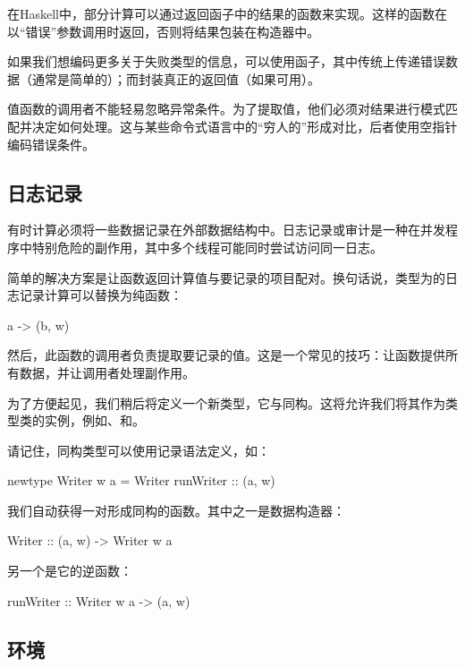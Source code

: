 \documentclass[DaoFP]{subfiles}
\begin{document}
在Haskell中，部分计算可以通过返回函子中的结果的函数来实现。这样的函数在以“错误”参数调用时返回，否则将结果包装在构造器中。

如果我们想编码更多关于失败类型的信息，可以使用函子，其中传统上传递错误数据（通常是简单的）；而封装真正的返回值（如果可用）。

值函数的调用者不能轻易忽略异常条件。为了提取值，他们必须对结果进行模式匹配并决定如何处理。这与某些命令式语言中的“穷人的”形成对比，后者使用空指针编码错误条件。

\subsection{日志记录}

有时计算必须将一些数据记录在外部数据结构中。日志记录或审计是一种在并发程序中特别危险的副作用，其中多个线程可能同时尝试访问同一日志。

简单的解决方案是让函数返回计算值与要记录的项目配对。换句话说，类型为的日志记录计算可以替换为纯函数：
\begin{haskell}
a -> (b, w)
\end{haskell}
然后，此函数的调用者负责提取要记录的值。这是一个常见的技巧：让函数提供所有数据，并让调用者处理副作用。

为了方便起见，我们稍后将定义一个新类型，它与同构。这将允许我们将其作为类型类的实例，例如、和。

请记住，同构类型可以使用记录语法定义，如：
\begin{haskell}
newtype Writer w a = Writer { runWriter :: (a, w) }
\end{haskell}
我们自动获得一对形成同构的函数。其中之一是数据构造器：
\begin{haskell}
Writer :: (a, w) -> Writer w a
\end{haskell}
另一个是它的逆函数：
\begin{haskell}
runWriter :: Writer w a -> (a, w) 
\end{haskell}

\subsection{环境}
\end{document}
